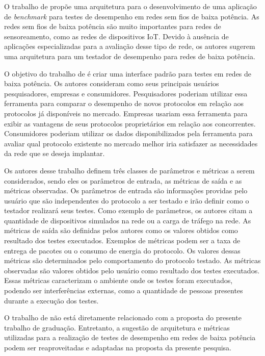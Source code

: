 O trabalho de  propõe uma arquitetura para o desenvolvimento de uma aplicação de \textit{benchmark} para testes de desempenho em redes sem fios de baixa potência.
As redes sem fios de baixa potência são muito importantes para redes de sensoreamento, como as redes de dispositivos IoT.
Devido à ausência de aplicações especializadas para a avaliação desse tipo de rede, os autores sugerem uma arquitetura para um testador de desempenho para redes de baixa potência.

O objetivo do trabalho de  é criar uma interface padrão para testes em redes de baixa potência. Os autores consideram como seus principais usuários pesquisadores, empresas e consumidores.
Pesquisadores poderiam utilizar essa ferramenta para comparar o desempenho de novos protocolos em relação aos protocolos já disponíveis no mercado.
Empresas usariam essa ferramenta para exibir as vantagens de seus protocolos proprietários em relação aos concorrentes.
Consumidores poderiam utilizar os dados disponibilizados pela ferramenta para avaliar qual protocolo existente no mercado melhor iria satisfazer as necessidades da rede que se deseja implantar.

Os autores desse trabalho definem três classes de parâmetros e métricas a serem considerados, sendo eles os parâmetros de entrada, as métricas de saída e as métricas observadas.
Os parâmetros de entrada são informações providas pelo usuário que são independentes do protocolo a ser testado e irão definir como o testador realizará seus testes. Como exemplo de parâmetros, os autores citam a quantidade de dispositivos simulados na rede ou a carga de tráfego na rede.
As métricas de saída são definidas pelos autores como os valores obtidos como resultado dos testes executados. Exemplos de métricas podem ser a taxa de entrega de pacotes ou o consumo de energia do protocolo. Os valores dessas métricas são determinados pelo comportamento do protocolo testado.
As métricas observadas são valores obtidos pelo usuário como resultado dos testes executados. Essas métricas caracterizam o ambiente onde os testes foram executados, podendo ser interferências externas, como a quantidade de pessoas presentes durante a execução dos testes.

O trabalho de  não está diretamente relacionado com a proposta do presente trabalho de graduação.
Entretanto, a sugestão de arquitetura e métricas utilizadas para a realização de testes de desempenho em redes de baixa potência podem ser reaproveitadas e adaptadas na proposta da presente pesquisa.

